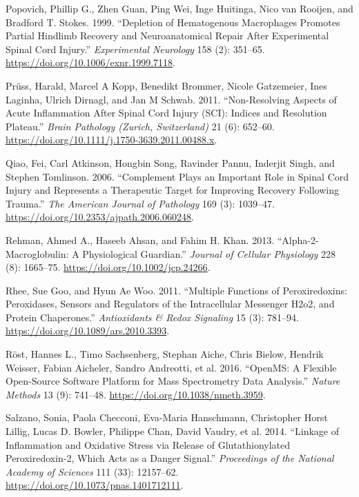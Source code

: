 \documentclass[9pt,lineno]{elife}
\newlength{\cslhangindent}
\newlength{\cslentryspacingunit} %
\newenvironment{CSLReferences}[2] %
 {%
  \setlength{\parindent}{0pt}
  \ifodd #1
  \let\oldpar\par
  \def\par{\hangindent=\cslhangindent\oldpar}
  \fi
  \setlength{\parskip}{#2\cslentryspacingunit}
 }%
 {}
\begin{document}
\begin{CSLReferences}{1}{0}
\leavevmode{}%
Popovich, Phillip G., Zhen Guan, Ping Wei, Inge Huitinga, Nico van Rooijen, and Bradford T. Stokes. 1999. {``Depletion of {Hematogenous Macrophages Promotes Partial Hindlimb Recovery} and {Neuroanatomical Repair} After {Experimental Spinal Cord Injury}.''} \emph{Experimental Neurology} 158 (2): 351--65. \url{https://doi.org/10.1006/exnr.1999.7118}.

\leavevmode{}%
Prüss, Harald, Marcel A Kopp, Benedikt Brommer, Nicole Gatzemeier, Ines Laginha, Ulrich Dirnagl, and Jan M Schwab. 2011. {``Non-Resolving Aspects of Acute Inflammation After Spinal Cord Injury ({SCI}): Indices and Resolution Plateau.''} \emph{Brain Pathology (Zurich, Switzerland)} 21 (6): 652--60. \url{https://doi.org/10.1111/j.1750-3639.2011.00488.x}.

\leavevmode{}%
Qiao, Fei, Carl Atkinson, Hongbin Song, Ravinder Pannu, Inderjit Singh, and Stephen Tomlinson. 2006. {``Complement {Plays} an {Important Role} in {Spinal Cord Injury} and {Represents} a {Therapeutic Target} for {Improving Recovery} Following {Trauma}.''} \emph{The American Journal of Pathology} 169 (3): 1039--47. \url{https://doi.org/10.2353/ajpath.2006.060248}.

\leavevmode{}%
Rehman, Ahmed A., Haseeb Ahsan, and Fahim H. Khan. 2013. {``Alpha-2-Macroglobulin: {A} Physiological Guardian.''} \emph{Journal of Cellular Physiology} 228 (8): 1665--75. \url{https://doi.org/10.1002/jcp.24266}.

\leavevmode{}%
Rhee, Sue Goo, and Hyun Ae Woo. 2011. {``Multiple {Functions} of {Peroxiredoxins}: {Peroxidases}, {Sensors} and {Regulators} of the {Intracellular Messenger H2o2}, and {Protein Chaperones}.''} \emph{Antioxidants \& Redox Signaling} 15 (3): 781--94. \url{https://doi.org/10.1089/ars.2010.3393}.

\leavevmode{}%
Röst, Hannes L., Timo Sachsenberg, Stephan Aiche, Chris Bielow, Hendrik Weisser, Fabian Aicheler, Sandro Andreotti, et al. 2016. {``{OpenMS}: A Flexible Open-Source Software Platform for Mass Spectrometry Data Analysis.''} \emph{Nature Methods} 13 (9): 741--48. \url{https://doi.org/10.1038/nmeth.3959}.

\leavevmode{}%
Salzano, Sonia, Paola Checconi, Eva-Maria Hanschmann, Christopher Horst Lillig, Lucas D. Bowler, Philippe Chan, David Vaudry, et al. 2014. {``Linkage of Inflammation and Oxidative Stress via Release of Glutathionylated Peroxiredoxin-2, Which Acts as a Danger Signal.''} \emph{Proceedings of the National Academy of Sciences} 111 (33): 12157--62. \url{https://doi.org/10.1073/pnas.1401712111}.


\end{CSLReferences}
\end{document}
